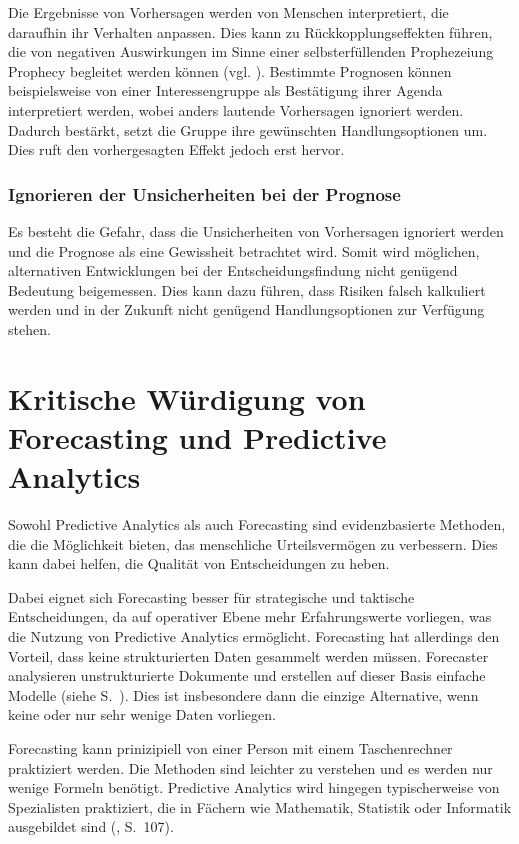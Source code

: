 Die Ergebnisse von Vorhersagen werden von Menschen interpretiert,
die daraufhin ihr Verhalten anpassen. Dies kann zu Rückkopplungseffekten führen,
die von negativen Auswirkungen im Sinne einer selbsterfüllenden Prophezeiung
 Prophecy\grqq{} begleitet werden können
(vgl. \cite{Crossman}). 
Bestimmte Prognosen können beispielsweise von einer 
Interessengruppe als Bestätigung ihrer Agenda interpretiert werden, wobei
anders lautende Vorhersagen ignoriert werden. Dadurch bestärkt, setzt die Gruppe
ihre gewünschten Handlungsoptionen um. Dies ruft den vorhergesagten Effekt
jedoch erst hervor.

\subsubsection{Ignorieren der Unsicherheiten bei der Prognose}

Es besteht die Gefahr, dass die Unsicherheiten von Vorhersagen ignoriert werden
und die Prognose als eine Gewissheit betrachtet wird. Somit wird möglichen,
alternativen Entwicklungen bei der Entscheidungsfindung nicht genügend Bedeutung
beigemessen. Dies kann dazu führen, dass Risiken falsch kalkuliert werden und
in der Zukunft nicht genügend Handlungsoptionen zur Verfügung stehen.

\section{Kritische Würdigung von Forecasting und Predictive Analytics}

Sowohl Predictive Analytics als auch Forecasting sind evidenzbasierte Methoden,
die die Möglichkeit bieten, das menschliche Urteilsvermögen zu verbessern. Dies
kann dabei helfen, die Qualität von Entscheidungen zu heben.

Dabei eignet sich Forecasting besser für strategische und taktische Entscheidungen,
da auf operativer Ebene mehr Erfahrungswerte vorliegen, was die Nutzung von
Predictive Analytics ermöglicht. Forecasting hat allerdings den Vorteil, dass
keine strukturierten Daten gesammelt werden müssen. Forecaster analysieren unstrukturierte
Dokumente und erstellen auf dieser Basis einfache Modelle (siehe S.~\xcom).
Dies ist insbesondere dann die einzige Alternative, wenn keine oder nur sehr wenige
Daten vorliegen.

Forecasting kann prinizipiell von einer Person mit einem Taschenrechner praktiziert
werden. Die Methoden sind leichter zu verstehen und es werden nur wenige Formeln benötigt.
Predictive Analytics wird hingegen typischerweise von Spezialisten praktiziert, 
die in Fächern wie Mathematik, Statistik oder Informatik ausgebildet sind (\cite{Gluchowski}, S.~107).

